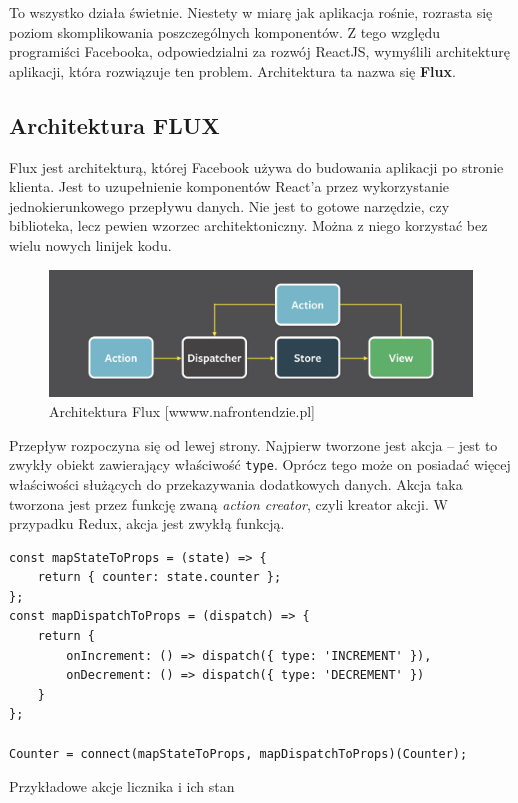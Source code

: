 To wszystko działa świetnie. Niestety w miarę jak aplikacja rośnie,
rozrasta się poziom skomplikowania poszczególnych komponentów.
Z tego względu programiści Facebooka, odpowiedzialni za rozwój ReactJS, wymyślili
architekturę aplikacji, która rozwiązuje ten problem.
Architektura ta nazwa się \textbf{Flux}.
~\cite{www_nafrontendzie}

\subsection{Architektura FLUX}

Flux jest architekturą, której Facebook używa do budowania aplikacji po stronie klienta.
Jest to uzupełnienie komponentów React’a przez wykorzystanie jednokierunkowego przepływu danych.
Nie jest to gotowe narzędzie, czy biblioteka, lecz pewien wzorzec architektoniczny.
Można z niego korzystać bez wielu nowych linijek kodu.

\begin{figure}
	\centering\includegraphics[width=.6\textwidth]{img/flux.png}
	\caption{Architektura Flux [wwww.nafrontendzie.pl]}\label{rys:flux}%
\end{figure}

Przepływ rozpoczyna się od lewej strony.
Najpierw tworzone jest akcja – jest to zwykły obiekt zawierający właściwość \texttt{type}.
Oprócz tego może on posiadać więcej właściwości służących do przekazywania dodatkowych danych.
Akcja taka tworzona jest przez funkcję zwaną \textit{action creator}, czyli kreator akcji.
W przypadku Redux, akcja jest zwykłą funkcją.

\begin{listing}
\begin{verbatim}
const mapStateToProps = (state) => {
    return { counter: state.counter };
};
const mapDispatchToProps = (dispatch) => {
    return {
        onIncrement: () => dispatch({ type: 'INCREMENT' }),
        onDecrement: () => dispatch({ type: 'DECREMENT' })
    }
};

Counter = connect(mapStateToProps, mapDispatchToProps)(Counter);
\end{verbatim}
\caption{Przykładowe akcje licznika i ich stan} \label{listing:licznik}
\end{listing}

